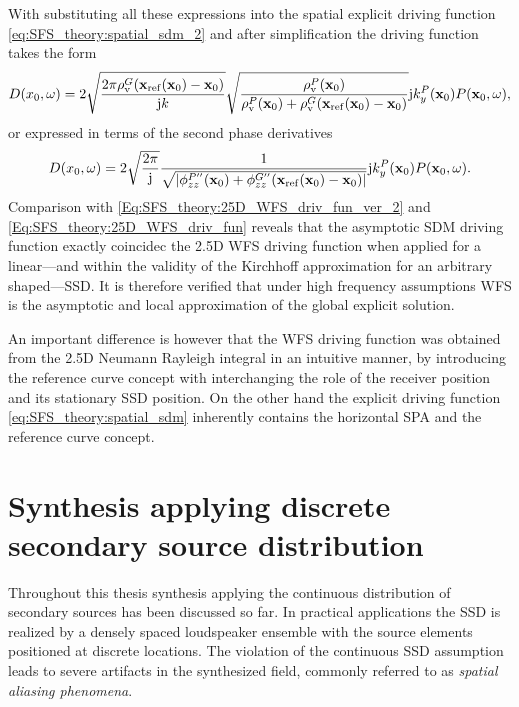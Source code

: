 With substituting all these expressions into the spatial explicit driving function \eqref{eq:SFS_theory:spatial_sdm_2} and after simplification the driving function takes the form
\begin{equation}
D(x_0,\omega) =
\small
2\sqrt{\frac{2\pi  \rho_\mathrm{v}^G(\mathbf{x}_{\mathrm{ref}}(\mathbf{x}_0)-\mathbf{x}_0)}{\mathrm{j} k}} 
\sqrt{\frac{\rho_\mathrm{v}^P(\mathbf{x}_0) }{\rho_\mathrm{v}^P(\mathbf{x}_0) + \rho_\mathrm{v}^G(\mathbf{x}_{\mathrm{ref}}(\mathbf{x}_0)-\mathbf{x}_0)}}
\mathrm{j} k_y^{P}(\mathbf{x}_0)
P(\mathbf{x}_0,\omega),
\end{equation}
or expressed in terms of the second phase derivatives 
\begin{equation}
D(x_0,\omega) =
\small
2\sqrt{\frac{2\pi }{\mathrm{j} }} 
\frac{ 1 }{\sqrt{|\phi^{P''}_{zz}(\mathbf{x}_0) + \phi^{G''}_{zz}(\mathbf{x}_{\mathrm{ref}}(\mathbf{x}_0)-\mathbf{x}_0)|}}
\mathrm{j} k_y^{P}(\mathbf{x}_0)
P(\mathbf{x}_0,\omega).
\end{equation}
Comparison with \eqref{Eq:SFS_theory:25D_WFS_driv_fun_ver_2} and \eqref{Eq:SFS_theory:25D_WFS_driv_fun} reveals that the asymptotic SDM driving function exactly coincidec the 2.5D WFS driving function when applied for a linear---and within the validity of the Kirchhoff approximation for an arbitrary shaped---SSD.
It is therefore verified that under high frequency assumptions WFS is the asymptotic and local approximation of the global explicit solution.

An important difference is however that the WFS driving function was obtained from the 2.5D Neumann Rayleigh integral in an intuitive manner, by introducing the reference curve concept with interchanging the role of the receiver position and its stationary SSD position. 
On the other hand the explicit driving function \eqref{eq:SFS_theory:spatial_sdm} inherently contains the horizontal SPA and the reference curve concept.

\section{Synthesis applying discrete secondary source distribution}
\label{Sec:Aliasing}

Throughout this thesis synthesis applying the continuous distribution of secondary sources has been discussed so far.
In practical applications the SSD is realized by a densely spaced loudspeaker ensemble with the source elements positioned at discrete locations.
The violation of the continuous SSD assumption leads to severe artifacts in the synthesized field, commonly referred to as \emph{spatial aliasing phenomena}.

